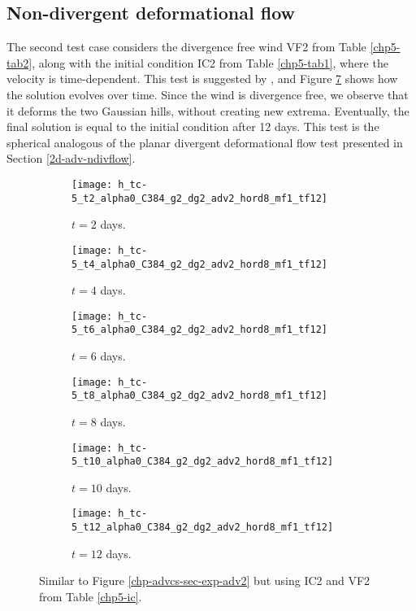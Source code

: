 \subsection{Non-divergent deformational flow}
The second test case considers the divergence free wind VF2 from Table \ref{chp5-tab2}, along with the initial condition IC2 from Table \ref{chp5-tab1}, 
where the velocity is time-dependent.
This test is suggested by \citet{nair:2010}, and Figure \ref{chp-advcs-sec-exp-adv3} shows how the solution evolves over time.
Since the wind is divergence free, we observe that it deforms the two Gaussian hills, without creating new extrema.
Eventually, the final solution is equal to the initial condition after 12 days.
This test is the spherical analogous of the planar divergent deformational flow test presented in Section \ref{2d-adv-ndivflow}.
\begin{figure}[!htb]
	\centering
	\begin{subfigure}{0.45\textwidth}
		\centering
		\texttt{[image: h\_tc-5\_t2\_alpha0\_C384\_g2\_dg2\_adv2\_hord8\_mf1\_tf12]}
		\caption{$t=2$ days.\label{chp-advcs-sec-exp-adv3-a}}
	\end{subfigure}
	\begin{subfigure}{0.45\textwidth}
		\centering
		\texttt{[image: h\_tc-5\_t4\_alpha0\_C384\_g2\_dg2\_adv2\_hord8\_mf1\_tf12]}
		\caption{$t=4$ days.\label{chp-advcs-sec-exp-adv3-b}}
	\end{subfigure}

	\begin{subfigure}{0.45\textwidth}
		\centering
		\texttt{[image: h\_tc-5\_t6\_alpha0\_C384\_g2\_dg2\_adv2\_hord8\_mf1\_tf12]}
		\caption{$t=6$ days.\label{chp-advcs-sec-exp-adv3-c}}
	\end{subfigure}
	\begin{subfigure}{0.45\textwidth}
		\centering
		\texttt{[image: h\_tc-5\_t8\_alpha0\_C384\_g2\_dg2\_adv2\_hord8\_mf1\_tf12]}
		\caption{$t=8$ days.\label{chp-advcs-sec-exp-adv3-d}}
	\end{subfigure}

	\begin{subfigure}{0.45\textwidth}
		\centering
		\texttt{[image: h\_tc-5\_t10\_alpha0\_C384\_g2\_dg2\_adv2\_hord8\_mf1\_tf12]}
		\caption{$t=10$ days.\label{chp-advcs-sec-exp-adv3-e}}
	\end{subfigure}
	\begin{subfigure}{0.45\textwidth}
		\centering
		\texttt{[image: h\_tc-5\_t12\_alpha0\_C384\_g2\_dg2\_adv2\_hord8\_mf1\_tf12]}
		\caption{$t=12$ days.\label{chp-advcs-sec-exp-adv3-f}}
	\end{subfigure}
	\caption{Similar to Figure \ref{chp-advcs-sec-exp-adv2} but using IC2 and VF2 from Table \ref{chp5-ic}.\label{chp-advcs-sec-exp-adv3}}
\end{figure}

